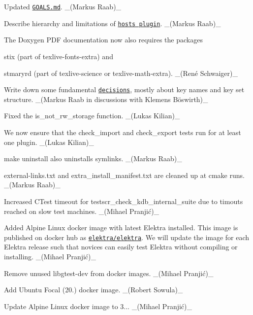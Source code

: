\begin{DoxyItemize}
\item Updated \href{http://www.libelektra.org/docgettingstarted/goals}{\tt G\+O\+A\+L\+S.\+md}. \+\_\+(\+Markus Raab)\+\_\+
\item Describe hierarchy and limitations of \href{https://www.libelektra.org/plugins/hosts}{\tt hosts plugin}. \+\_\+(\+Markus Raab)\+\_\+
\item The Doxygen P\+DF documentation now also requires the packages
\begin{DoxyItemize}
\item {\ttfamily stix} (part of {\ttfamily texlive-\/fonts-\/extra}) and
\item {\ttfamily stmaryrd} (part of {\ttfamily texlive-\/science} or {\ttfamily texlive-\/math-\/extra}). \+\_\+(René Schwaiger)\+\_\+
\end{DoxyItemize}
\item Write down some fundamental \href{https://www.libelektra.org/decisions/readme}{\tt decisions}, mostly about key names and key set structure. \+\_\+(Markus Raab in discussions with Klemens Böswirth)\+\_\+
\end{DoxyItemize}


\begin{DoxyItemize}
\item Fixed the {\ttfamily is\+\_\+not\+\_\+rw\+\_\+storage} function. \+\_\+(\+Lukas Kilian)\+\_\+
\item We now ensure that the {\ttfamily check\+\_\+import} and {\ttfamily check\+\_\+export} tests run for at least one plugin. \+\_\+(\+Lukas Kilian)\+\_\+
\end{DoxyItemize}


\begin{DoxyItemize}
\item {\ttfamily make uninstall} also uninstalls symlinks. \+\_\+(\+Markus Raab)\+\_\+
\item {\ttfamily external-\/links.\+txt} and {\ttfamily extra\+\_\+install\+\_\+manifest.\+txt} are cleaned up at cmake runs. \+\_\+(\+Markus Raab)\+\_\+
\item Increased C\+Test timeout for {\ttfamily testscr\+\_\+check\+\_\+kdb\+\_\+internal\+\_\+suite} due to timouts reached on slow test machines. \+\_\+(Mihael Pranjić)\+\_\+
\end{DoxyItemize}


\begin{DoxyItemize}
\item Added Alpine Linux docker image with latest Elektra installed. This image is published on docker hub as \href{https://hub.docker.com/r/elektra/elektra}{\tt elektra/elektra}. We will update the image for each Elektra release such that novices can easily test Elektra without compiling or installing. \+\_\+(Mihael Pranjić)\+\_\+
\item Remove unused {\ttfamily libgtest-\/dev} from docker images. \+\_\+(Mihael Pranjić)\+\_\+
\item Add Ubuntu Focal (20.) docker image. \+\_\+(\+Robert Sowula)\+\_\+
\item Update Alpine Linux docker image to 3... \+\_\+(Mihael Pranjić)\+\_\+
\end{DoxyItemize}


